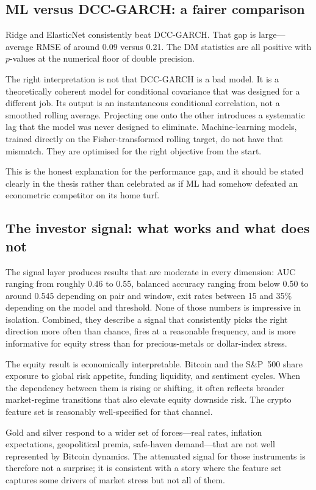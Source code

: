 \subsection{ML versus DCC-GARCH: a fairer comparison}

Ridge and ElasticNet consistently beat DCC-GARCH. That gap is large---average RMSE of around 0.09 versus 0.21. The DM statistics are all positive with $p$-values at the numerical floor of double precision.

The right interpretation is not that DCC-GARCH is a bad model. It is a theoretically coherent model for conditional covariance that was designed for a different job. Its output is an instantaneous conditional correlation, not a smoothed rolling average. Projecting one onto the other introduces a systematic lag that the model was never designed to eliminate. Machine-learning models, trained directly on the Fisher-transformed rolling target, do not have that mismatch. They are optimised for the right objective from the start.

This is the honest explanation for the performance gap, and it should be stated clearly in the thesis rather than celebrated as if ML had somehow defeated an econometric competitor on its home turf.

\subsection{The investor signal: what works and what does not}

The signal layer produces results that are moderate in every dimension: AUC ranging from roughly 0.46 to 0.55, balanced accuracy ranging from below 0.50 to around 0.545 depending on pair and window, exit rates between 15 and 35\% depending on the model and threshold. None of those numbers is impressive in isolation. Combined, they describe a signal that consistently picks the right direction more often than chance, fires at a reasonable frequency, and is more informative for equity stress than for precious-metals or dollar-index stress.

The equity result is economically interpretable. Bitcoin and the S\&P~500 share exposure to global risk appetite, funding liquidity, and sentiment cycles. When the dependency between them is rising or shifting, it often reflects broader market-regime transitions that also elevate equity downside risk. The crypto feature set is reasonably well-specified for that channel.

Gold and silver respond to a wider set of forces---real rates, inflation expectations, geopolitical premia, safe-haven demand---that are not well represented by Bitcoin dynamics. The attenuated signal for those instruments is therefore not a surprise; it is consistent with a story where the feature set captures some drivers of market stress but not all of them.

